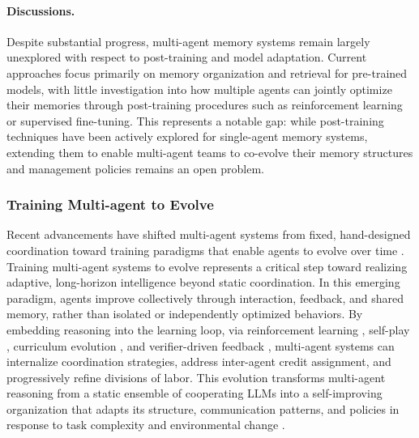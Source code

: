 
\paragraph{Discussions.}

Despite substantial progress, multi-agent memory systems remain largely unexplored with respect to post-training and model adaptation. Current approaches focus primarily on memory organization and retrieval for pre-trained models, with little investigation into how multiple agents can jointly optimize their memories through post-training procedures such as reinforcement learning or supervised fine-tuning. This represents a notable gap: while post-training techniques have been actively explored for single-agent memory systems, extending them to enable multi-agent teams to co-evolve their memory structures and management policies remains an open problem.




\subsubsection{Training Multi-agent to Evolve}

Recent advancements have shifted multi-agent systems from fixed, hand-designed coordination toward training paradigms that enable agents to evolve over time \cite{ma2024coevolving, multi-agent-evolve, zhao2025sirius}. Training multi-agent systems to evolve represents a critical step toward realizing adaptive, long-horizon intelligence beyond static coordination. In this emerging paradigm, agents improve collectively through interaction, feedback, and shared memory, rather than isolated or independently optimized behaviors. By embedding reasoning into the learning loop, via reinforcement learning \cite{marft}, self-play \cite{strongermas}, curriculum evolution \cite{park2025maporl}, and verifier-driven feedback \cite{marlhf}, multi-agent systems can internalize coordination strategies, address inter-agent credit assignment, and progressively refine divisions of labor. This evolution transforms multi-agent reasoning from a static ensemble of cooperating LLMs into a self-improving organization that adapts its structure, communication patterns, and policies in response to task complexity and environmental change \cite{zhao2023chatenvironmentinteractivemultimodal}.

